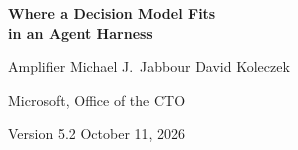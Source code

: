 \documentclass[11pt,letterpaper]{article}
\begin{document}
\thispagestyle{plain}
\begin{center}
  {\LARGE\sffamily\bfseries Where a Decision Model Fits\\[3pt] in an Agent Harness\par}
  \vspace{10pt}
  {\large Amplifier \qquad Michael J.\ Jabbour \qquad David Koleczek\par}
  \vspace{3pt}
  {\normalsize Microsoft, Office of the CTO\par}
  \vspace{3pt}
  {\normalsize Version 5.2 \textperiodcentered{} October 11, 2026\par}
\end{center}
\vspace{4pt}














\end{document}
